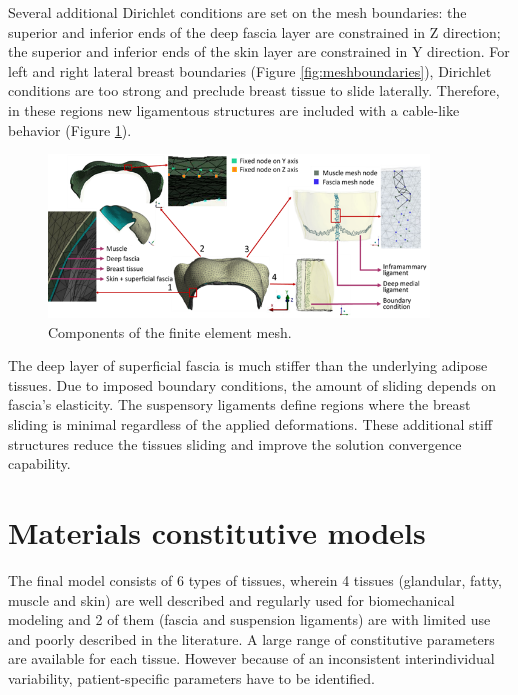 Several additional Dirichlet conditions are set on the mesh boundaries: the superior and inferior ends of the deep fascia layer are constrained in Z direction; the superior and inferior ends of the skin layer are constrained in Y direction. For left and right lateral breast boundaries (Figure \ref{fig:meshboundaries}), Dirichlet conditions are too strong and preclude breast tissue to slide laterally. Therefore, in these regions new ligamentous structures are included with a cable-like behavior (Figure \ref{fig:mesh_components_BC}).



\begin{figure}[!h]
\centering
\includegraphics[width=0.9\textwidth,keepaspectratio]{figures/mesh_components.png} 
\caption{Components of the finite element mesh.}\label{fig:mesh_components_BC}
\end{figure}

 The deep layer of superficial fascia is much stiffer than the underlying adipose tissues. Due to imposed boundary conditions, the amount of sliding depends on fascia's elasticity. The suspensory ligaments define regions where the breast sliding is minimal regardless of the applied deformations. These additional stiff structures reduce the tissues sliding and improve the solution convergence capability. 

\section{Materials constitutive models}
\label{section:myConstitutivModels}

The final model consists of 6 types of tissues, wherein 4 tissues (glandular, fatty, muscle and skin) are well described and regularly used for biomechanical modeling and 2 of them (fascia and suspension ligaments) are with limited use and poorly described in the literature. A large range of constitutive parameters are available for each tissue. However because of an inconsistent interindividual variability, patient-specific parameters have to be identified.  


